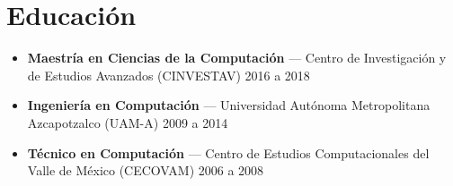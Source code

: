 \section*{Educación}
\begin{itemize}[leftmargin=12pt]
    \item \textbf{Maestría en Ciencias de la Computación} — Centro de Investigación y de Estudios Avanzados (CINVESTAV) \hfill 2016 a 2018
    \item \textbf{Ingeniería en Computación} — Universidad Autónoma Metropolitana Azcapotzalco (UAM-A) \hfill 2009 a 2014
    \item \textbf{Técnico en Computación} — Centro de Estudios Computacionales del Valle de México (CECOVAM) \hfill 2006 a 2008
\end{itemize}
